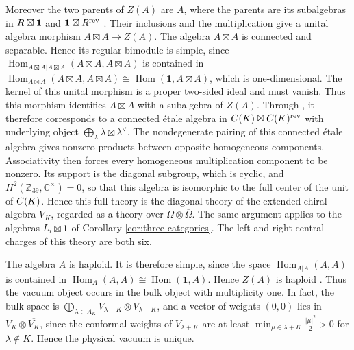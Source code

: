 \documentclass[leqno]{article}
\newcommand{\Cbb}{\ensuremath{\mathbb{C}}}
\let\cal\relax
\newcommand{\cal}{\mathcal}
\newcommand{\Z}{\ensuremath{\mathbb{Z}}}
\newcommand{\ot}{\otimes}
\numberwithin{equation}{section}
\begin{document}
Moreover the two parents of $Z(A)$ are $A$, where the parents are its subalgebras in $\cal R\boxtimes\mathbf1$ and $\mathbf1\boxtimes\cal R^{\mathrm{rev}}$ \cite[Section 2.5]{Dav10}. Their inclusions and the multiplication give a unital algebra morphism $A\boxtimes A \to Z(A)$. The algebra $A\boxtimes A$ is connected and separable. Hence its regular bimodule is simple, since $\operatorname{Hom}_{A\boxtimes A|A\boxtimes A}(A\boxtimes A,A\boxtimes A)$ is contained in $\operatorname{Hom}_{A\boxtimes A}(A\boxtimes A,A\boxtimes A) \cong \operatorname{Hom}(\mathbf1,A\boxtimes A)$, which is one-dimensional. The kernel of this unital morphism is a proper two-sided ideal and must vanish. Thus this morphism identifies $A\boxtimes A$ with a subalgebra of $Z(A)$. Through \cite[Proposition 3.16 p.~12]{DMNO13}, it therefore corresponds to a connected \'etale algebra in $\cal C(K)\boxtimes\cal C(K)^{\mathrm{rev}}$ with underlying object $\bigoplus_\lambda\lambda\boxtimes\lambda^\vee$. The nondegenerate pairing of this connected \'etale algebra gives nonzero products between opposite homogeneous components. Associativity then forces every homogeneous multiplication component to be nonzero. Its support is the diagonal subgroup, which is cyclic, and $H^2(\Z_{39},\Cbb^\times) = 0$, so that this algebra is isomorphic to the full center of the unit of $\cal C(K)$. Hence this full theory is the diagonal theory of the extended chiral algebra $V_K$, regarded as a theory over $\Omega \ot \overline\Omega$. The same argument applies to the algebras $L_i\boxtimes\mathbf1$ of Corollary \ref{cor:three-categories}. The left and right central charges of this theory are both six.

The algebra $A$ is haploid. It is therefore simple, since the space $\operatorname{Hom}_{A|A}(A,A)$ is contained in $\operatorname{Hom}_A(A,A) \cong \operatorname{Hom}(\mathbf 1,A)$. Hence $Z(A)$ is haploid \cite[Proposition 2.7(ii)]{KoR08}. Thus the vacuum object occurs in the bulk object with multiplicity one. In fact, the bulk space is $\bigoplus_{\lambda \in A_K} V_{\lambda+K} \ot \overline{V_{\lambda+K}}$, and a vector of weights $(0,0)$ lies in $V_K \ot \overline{V_K}$, since the conformal weights of $V_{\lambda+K}$ are at least $\min_{\mu \in \lambda+K}\frac{|\mu|^2}{2} > 0$ for $\lambda \notin K$. Hence the physical vacuum is unique.
\end{document}
